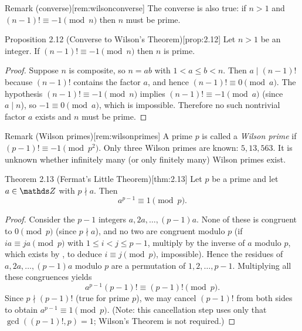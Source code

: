 \documentclass[10pt]{article}
\theoremstyle{definition}
\theoremstyle{plain}
\numberwithin{equation}{section}
\begin{document}
\begin{define}{Remark (converse)}[rem:wilsonconverse]
The converse is also true: if $n>1$ and $(n-1)!\equiv -1\pmod{n}$ then $n$ must be prime.
\end{define}

\begin{define}{Proposition 2.12 (Converse to Wilson's Theorem)}[prop:2.12]
Let $n>1$ be an integer. If $(n-1)!\equiv -1\pmod{n}$ then $n$ is prime.
\end{define}

\begin{proof}
Suppose $n$ is composite, so $n=ab$ with $1<a\le b<n$. Then $a\mid (n-1)!$ because $(n-1)!$
contains the factor $a$, and hence $(n-1)!\equiv 0\pmod{a}$. The hypothesis $(n-1)!\equiv -1\pmod{n}$
implies $(n-1)!\equiv -1\pmod{a}$ (since $a\mid n$), so $-1\equiv 0\pmod{a}$, which is impossible.
Therefore no such nontrivial factor $a$ exists and $n$ must be prime.
\end{proof}

\begin{define}{Remark (Wilson primes)}[rem:wilsonprimes]
A prime $p$ is called a \emph{Wilson prime} if $(p-1)!\equiv -1\pmod{p^2}$. Only three Wilson primes
are known: $5,13,563$. It is unknown whether infinitely many (or only finitely many) Wilson primes exist.
\end{define}


\begin{define}{Theorem 2.13 (Fermat's Little Theorem)}[thm:2.13]
Let $p$ be a prime and let $a\in\setZ$ with $p\nmid a$. Then
\[
a^{p-1}\equiv 1\pmod{p}.
\]
\end{define}

\begin{proof}
Consider the $p-1$ integers $a,2a,\dots,(p-1)a$. None of these is congruent to $0\pmod{p}$
(since $p\nmid a$), and no two are congruent modulo $p$ (if $ia\equiv ja\pmod p$ with
$1\le i<j\le p-1$, multiply by the inverse of $a$ modulo $p$, which exists by
, to deduce $i\equiv j\pmod p$, impossible). Hence the residues of
$a,2a,\dots,(p-1)a$ modulo $p$ are a permutation of $1,2,\dots,p-1$. Multiplying all these
congruences yields
\[
a^{p-1}(p-1)! \equiv (p-1)!\pmod{p}.
\]
Since $p\nmid (p-1)!$ (true for prime $p$), we may cancel $(p-1)!$ from both sides to obtain
$a^{p-1}\equiv 1\pmod{p}$. (Note: this cancellation step uses only that $\gcd((p-1)!,p)=1$;
Wilson's Theorem is not required.)
\end{proof}
\end{document}
